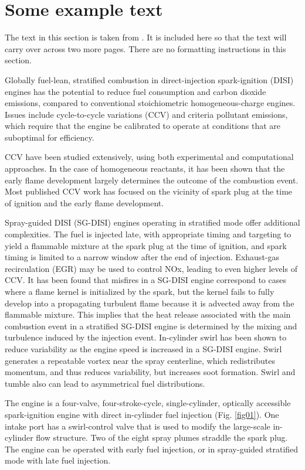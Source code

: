 \documentclass[times,twocolumn,final]{elsarticle}
\begin{document}
\section{Some example text}

The text in this section is taken from \cite{kazmouz2021}. It is included here so that
the text will carry over across two more pages. There are no formatting
instructions in this section.

Globally fuel-lean, stratified combustion in direct-injection
spark-ignition (DISI) engines has the potential to reduce fuel
consumption and carbon dioxide emissions, compared to conventional stoichiometric homogeneous-charge engines. Issues include cycle-to-cycle variations (CCV) and criteria pollutant emissions, which require that the engine be calibrated to operate at conditions that are suboptimal for efficiency.

CCV have been studied extensively, using both experimental and
computational approaches. In the case of homogeneous reactants, it has
been shown that the early flame development largely determines the
outcome of the combustion event. Most published CCV work has focused on
the vicinity of spark plug at the time of ignition and the early flame
development.

Spray-guided DISI (SG-DISI) engines operating in stratified mode offer
additional complexities. The fuel is injected late, with appropriate
timing and targeting to yield a flammable mixture at the spark plug at
the time of ignition, and spark timing is limited to a narrow window
after the end of injection. Exhaust-gas recirculation (EGR) may be used
to control NOx, leading to even higher levels of CCV. It has been found
that misfires in a SG-DISI engine correspond to cases where a flame
kernel is initialized by the spark, but the kernel fails to fully
develop into a propagating turbulent flame because it is advected away
from the flammable mixture. This implies that the heat release
associated with the main combustion event in a stratified SG-DISI
engine is determined by the mixing and turbulence induced by the
injection event. In-cylinder swirl has been shown to reduce variability
as the engine speed is increased in a SG-DISI engine. Swirl generates a
repeatable vortex near the spray centerline, which redistributes
momentum, and thus reduces variability, but increases soot formation.
Swirl and tumble also can lead to asymmetrical fuel distributions.

The engine is a four-valve, four-stroke-cycle, single-cylinder,
optically accessible spark-ignition engine with direct in-cylinder fuel
injection (Fig. \ref{fig01}). One intake port has a swirl-control valve that is
used to modify the large-scale in-cylinder flow structure. Two of the
eight spray plumes straddle the spark plug. The engine can be operated
with early fuel injection, or in spray-guided stratified mode with late
fuel injection.
\end{document}
